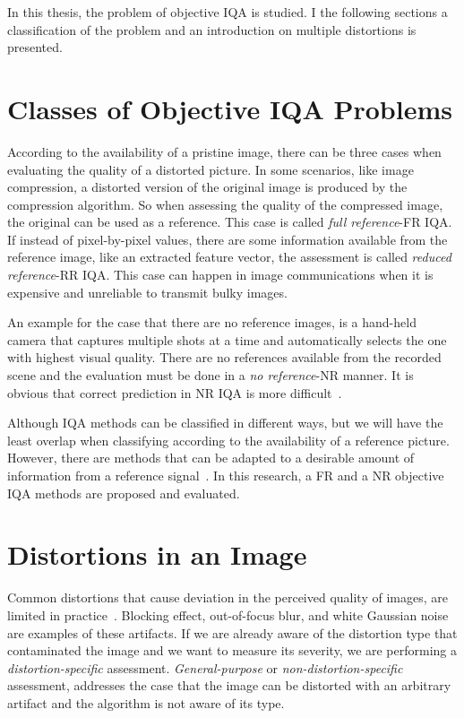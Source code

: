 In this thesis, the problem of objective IQA is studied. I the following sections a classification of the problem and an introduction on multiple distortions is presented.

\section{Classes of Objective IQA Problems}
According to the availability of a pristine image, there can be three cases when evaluating the quality of a distorted picture. In some scenarios, like image compression, a distorted version of the original image is produced by the compression algorithm. So when assessing the quality of the compressed image, the original can be used as a reference. This case is called \emph{full reference}-FR IQA. If instead of pixel-by-pixel values, there are some information available from the reference image, like an extracted feature vector, the assessment is called \emph{reduced reference}-RR IQA. This case can happen in image communications when it is expensive and unreliable to transmit bulky images.

An example for the case that there are no reference images, is a hand-held camera that captures multiple shots at a time and automatically selects the one with highest visual quality. There are no references available from the recorded scene and the evaluation must be done in a \emph{no reference}-NR manner. It is obvious that correct prediction in NR IQA is more difficult~\cite{Kang2014}.

Although IQA methods can be classified in different ways, but we will have the least overlap when classifying according to the availability of a reference picture. However, there are methods that can be adapted to a desirable amount of information from a reference signal~\cite{Bosse2018, torkamani2018image}. In this research, a FR and a NR objective IQA methods are proposed and evaluated.
\section{Distortions in an Image}
Common distortions that cause deviation in the perceived quality of images, are limited in practice~\cite{Chandler2013}. Blocking effect, out-of-focus blur, and white Gaussian noise are examples of these artifacts. If we are already aware of the distortion type that contaminated the image and we want to measure its severity, we are performing a \emph{distortion-specific} assessment. \emph{General-purpose} or \emph{non-distortion-specific} assessment, addresses the case that the image can be distorted with an arbitrary artifact and the algorithm is not aware of its type.

